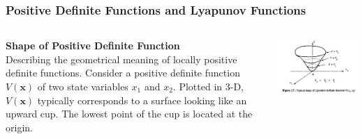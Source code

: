 \documentclass[11pt,handout]{beamer}   %
\begin{document}
\begin{frame}
\frametitle{Positive Definite Functions and Lyapunov Functions}
\begin{columns}
\begin{column}{0.5\textwidth}
\textbf{Shape of Positive Definite Function}\\
Describing the geometrical meaning of locally positive definite functions. Consider a positive definite function $V(\mathbf{x})$ of two state variables $x_1$ and $x_2$. Plotted in 3-D, $V(\mathbf{x})$ typically corresponds to a surface looking like an upward cup. The lowest point of the cup is located at the origin.
\end{column}
\begin{column}{0.5\textwidth}
\begin{center}
\includegraphics[width = \textwidth]{Figures/Fig37.PNG}
\end{center}
\end{column}
\end{columns}
\end{frame}
\end{document}
